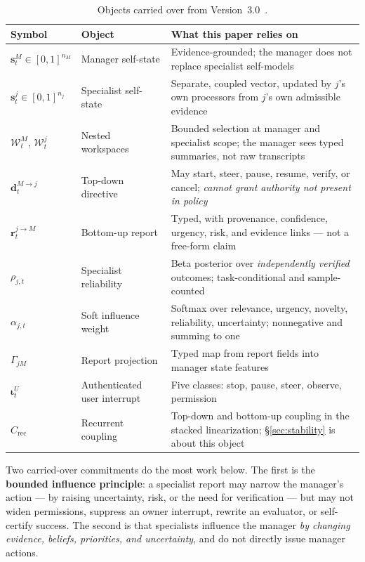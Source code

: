 \documentclass[11pt]{article}
\newcommand{\sM}{\mathbf{s}^{M}}
\newcommand{\sJ}{\mathbf{s}^{j}}
\newcommand{\WM}{\mathcal{W}^{M}}
\newcommand{\WJ}{\mathcal{W}^{j}}
\newcommand{\DMJ}{\mathbf{d}^{M\rightarrow j}}
\newcommand{\RJM}{\mathbf{r}^{j\rightarrow M}}
\newcommand{\IU}{\boldsymbol{\iota}^{U}}
\begin{document}
\begin{table}[h]
\centering\small
\caption{Objects carried over from Version~3.0~\citep{yang2026hierarchical}.}
\label{tab:carried}
\begin{tabular}{@{}lL{3.9cm}L{7.5cm}@{}}
\toprule
\textbf{Symbol} & \textbf{Object} & \textbf{What this paper relies on} \\
\midrule
$\sM_t\in[0,1]^{n_M}$ & Manager self-state & Evidence-grounded; the manager does not replace specialist self-models \\
$\sJ_t\in[0,1]^{n_j}$ & Specialist self-state & Separate, coupled vector, updated by $j$'s own processors from $j$'s own admissible evidence \\
$\WM_t$, $\WJ_t$ & Nested workspaces & Bounded selection at manager and specialist scope; the manager sees typed summaries, not raw transcripts \\
$\DMJ_t$ & Top-down directive & May start, steer, pause, resume, verify, or cancel; \emph{cannot grant authority not present in policy} \\
$\RJM_t$ & Bottom-up report & Typed, with provenance, confidence, urgency, risk, and evidence links --- not a free-form claim \\
$\rho_{j,t}$ & Specialist reliability & Beta posterior over \emph{independently verified} outcomes; task-conditional and sample-counted \\
$\alpha_{j,t}$ & Soft influence weight & Softmax over relevance, urgency, novelty, reliability, uncertainty; nonnegative and summing to one \\
$\Gamma_{jM}$ & Report projection & Typed map from report fields into manager state features \\
$\IU_t$ & Authenticated user interrupt & Five classes: stop, pause, steer, observe, permission \\
$C_{\mathrm{rec}}$ & Recurrent coupling & Top-down and bottom-up coupling in the stacked linearization; \S\ref{sec:stability} is about this object \\
\bottomrule
\end{tabular}
\end{table}

Two carried-over commitments do the most work below. The first is the \textbf{bounded influence principle}: a specialist report may narrow the manager's action --- by raising uncertainty, risk, or the need for verification --- but may not widen permissions, suppress an owner interrupt, rewrite an evaluator, or self-certify success. The second is that specialists influence the manager \emph{by changing evidence, beliefs, priorities, and uncertainty}, and do not directly issue manager actions.
\end{document}
